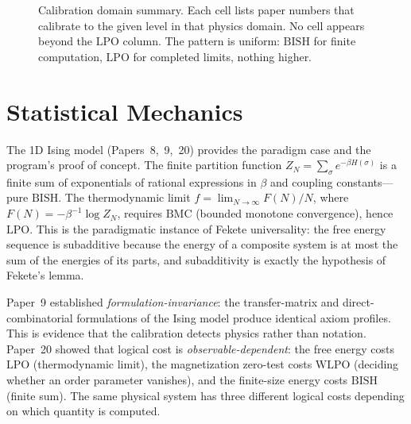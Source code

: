 \documentclass[11pt,a4paper]{report}
\theoremstyle{plain}
\theoremstyle{definition}
\theoremstyle{remark}
\newcommand{\BISH}{\mathrm{BISH}}
\newcommand{\WLPO}{\mathrm{WLPO}}
\newcommand{\LPO}{\mathrm{LPO}}
\newcommand{\BMC}{\mathrm{BMC}}
\begin{document}
\begin{figure}[t]
\caption{Calibration domain summary. Each cell lists paper numbers that calibrate to the given level in that physics domain. No cell appears beyond the $\LPO$ column. The pattern is uniform: $\BISH$ for finite computation, $\LPO$ for completed limits, nothing higher.}
\label{fig:calibration-grid}
\end{figure}

\section{Statistical Mechanics}

The 1D Ising model (Papers~8,~9,~20) provides the paradigm case and the program's proof of concept.  The finite partition function $Z_N = \sum_{\sigma} e^{-\beta H(\sigma)}$ is a finite sum of exponentials of rational expressions in $\beta$ and coupling constants---pure $\BISH$.  The thermodynamic limit $f = \lim_{N\to\infty} F(N)/N$, where $F(N) = -\beta^{-1}\log Z_N$, requires $\BMC$ (bounded monotone convergence), hence $\LPO$.  This is the paradigmatic instance of Fekete universality: the free energy sequence is subadditive because the energy of a composite system is at most the sum of the energies of its parts, and subadditivity is exactly the hypothesis of Fekete's lemma.

Paper~9 established \emph{formulation-invariance}: the transfer-matrix and direct-combinatorial formulations of the Ising model produce identical axiom profiles.  This is evidence that the calibration detects physics rather than notation.  Paper~20 showed that logical cost is \emph{observable-dependent}: the free energy costs $\LPO$ (thermodynamic limit), the magnetization zero-test costs $\WLPO$ (deciding whether an order parameter vanishes), and the finite-size energy costs $\BISH$ (finite sum).  The same physical system has three different logical costs depending on which quantity is computed.
\end{document}
